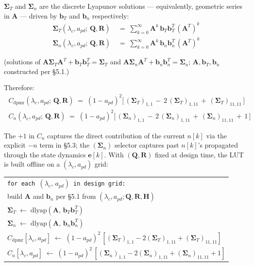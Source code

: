 \documentclass[11pt]{article}
\newcommand{\T}{^{T}}
\begin{document}
$\bm{\Sigma}_T$ and $\bm{\Sigma}_n$ are the discrete Lyapunov solutions --- equivalently, geometric series in $\bm{A}$ --- driven by $\bm{b}_T$ and $\bm{b}_n$ respectively:
\begin{align*}
\bm{\Sigma}_T(\lambda_c, a_{pd};\, \bm{Q}, \bm{R})
  &\;=\; \sum_{k=0}^{\infty} \bm{A}^{k}\,\bm{b}_T\bm{b}_T\T\,(\bm{A}\T)^{k} \\[2pt]
\bm{\Sigma}_n(\lambda_c, a_{pd};\, \bm{Q}, \bm{R})
  &\;=\; \sum_{k=0}^{\infty} \bm{A}^{k}\,\bm{b}_n\bm{b}_n\T\,(\bm{A}\T)^{k}
\end{align*}

\noindent (solutions of $\bm{A}\bm{\Sigma}_T\bm{A}\T + \bm{b}_T\bm{b}_T\T = \bm{\Sigma}_T$ and $\bm{A}\bm{\Sigma}_n\bm{A}\T + \bm{b}_n\bm{b}_n\T = \bm{\Sigma}_n$; $\bm{A}, \bm{b}_T, \bm{b}_n$ constructed per \S5.1.)

Therefore:
\begin{gather}
\boxed{\;C_{\mathrm{dpmr}}(\lambda_c, a_{pd};\, \bm{Q}, \bm{R}) \;=\; (1-a_{pd})^{2}\bigl[\,
  (\bm{\Sigma}_T)_{1,1} \,-\, 2\,(\bm{\Sigma}_T)_{1,11} \,+\, (\bm{\Sigma}_T)_{11,11}\,\bigr]\;} \\[4pt]
\boxed{\;C_{n}(\lambda_c, a_{pd};\, \bm{Q}, \bm{R}) \;=\; (1-a_{pd})^{2}\bigl[\,
  (\bm{\Sigma}_n)_{1,1} \,-\, 2\,(\bm{\Sigma}_n)_{1,11} \,+\, (\bm{\Sigma}_n)_{11,11} \,+\, 1\,\bigr]\;}
\end{gather}

\noindent The $+1$ in $C_{n}$ captures the direct contribution of the current $n[k]$ via the explicit $-n$ term in \S5.3; the $(\bm{\Sigma}_n)$ selector captures past $n[k]$'s propagated through the state dynamics $\bm{e}[k]$. With $(\bm{Q}, \bm{R})$ fixed at design time, the LUT is built offline on a $(\lambda_c, a_{pd})$ grid:

\begin{center}
\begin{tabular}{@{}l@{}}
\texttt{for each $(\lambda_c,\, a_{pd})$ in design grid:} \\
\quad build $\bm{A}$ and $\bm{b}_n$ per \S5.1 from $(\lambda_c, a_{pd}; \bm{Q}, \bm{R}, \bm{H})$ \\
\quad $\bm{\Sigma}_T \;\leftarrow\; \mathrm{dlyap}(\bm{A},\, \bm{b}_T\bm{b}_T\T)$ \\
\quad $\bm{\Sigma}_n \;\leftarrow\; \mathrm{dlyap}(\bm{A},\, \bm{b}_n\bm{b}_n\T)$ \\
\quad $C_{\mathrm{dpmr}}[\lambda_c, a_{pd}] \;\leftarrow\; (1-a_{pd})^2\,[(\bm{\Sigma}_T)_{1,1} - 2(\bm{\Sigma}_T)_{1,11} + (\bm{\Sigma}_T)_{11,11}]$ \\
\quad $C_{n}[\lambda_c, a_{pd}] \;\leftarrow\; (1-a_{pd})^2\,[(\bm{\Sigma}_n)_{1,1} - 2(\bm{\Sigma}_n)_{1,11} + (\bm{\Sigma}_n)_{11,11} + 1]$ \\
\end{tabular}
\end{center}
\end{document}

